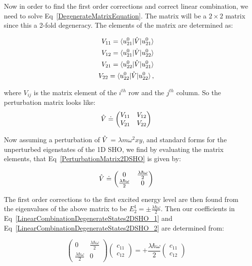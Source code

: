 \noindent Now in order to find the first order corrections and correct linear combination, we need to solve Eq~\ref{DegenerateMatrixEquation}. The matrix will be a $2 \times 2$ matrix since this a 2-fold degeneracy. The elements of the matrix are determined as:

\begin{eqnarray}
    V_{11} = \braket{u^0_{21} | \Hat{V} | u^0_{21}}  \\
    V_{12} = \braket{u^0_{21} | \Hat{V} | u^0_{22}} \\
    V_{21} = \braket{u^0_{22} | \Hat{V} | u^0_{21}} \\
    V_{22} = \braket{u^0_{22} | \Hat{V} | u^0_{22}},
    \label{MatrixElements2DSHO}
\end{eqnarray}

\noindent where $V_{ij}$ is the matrix element of the $i^{th}$ row and the $j^{th}$ column. So the perturbation matrix looks like:
\begin{equation}
    \Hat{V} \doteq \begin{pmatrix} V_{11} & V_{12} \\ V_{21} & V_{22} \end{pmatrix}
    \label{PerturbationMatrix2DSHO}
\end{equation}

\noindent Now assuming a perturbation of $\Hat{V}$ = $\lambda m  \omega^2 xy$, and standard forms for the unperturbed eigenstates of the 1D SHO, we find by evaluating the matrix elements, that Eq~\ref{PerturbationMatrix2DSHO} is given by:

\begin{equation}
    \Hat{V} \doteq \begin{pmatrix} 0 & \frac{\lambda \hbar \omega}{2} \\ \frac{\lambda \hbar \omega}{2} & 0 \end{pmatrix}
\end{equation}

\noindent The first order corrections to the first excited energy level are then found from the eigenvalues of the above matrix to be $E^1_2 = \pm \frac{\lambda \hbar \omega}{2}$. Then our coefficients in Eq~\ref{LinearCombinationDegenerateStates2DSHO_1} and Eq~\ref{LinearCombinationDegenerateStates2DSHO_2} are determined from:

\begin{equation}
    \begin{pmatrix} 0 & \frac{\lambda \hbar \omega}{2} \\ \frac{\lambda \hbar \omega}{2} & 0 \end{pmatrix} \begin{pmatrix} c_{11} \\ c_{12} \end{pmatrix} = + \frac{\lambda \hbar \omega}{2} \begin{pmatrix} c_{11} \\ c_{12} \end{pmatrix}
\end{equation}

